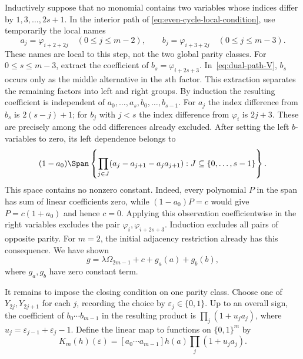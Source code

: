 Inductively suppose that no monomial contains two variables whose indices
differ by $1,3,\ldots,2s+1$. In the interior path of
\eqref{eq:even-cycle-local-condition}, use temporarily the local names
\[
 a_j=\varphi_{i+2+2j}\quad(0\le j\le m-2),\qquad
 b_j=\varphi_{i+3+2j}\quad(0\le j\le m-3).
\]
These names are local to this step, not the two global parity classes.
For $0\le s\le m-3$, extract the coefficient of
$b_s=\varphi_{i+2s+3}$.
In~\eqref{eq:dual-path-V}, $b_s$ occurs only as the middle alternative
in the $s$th factor. This extraction separates the remaining factors
into left and right groups. By induction the resulting coefficient is
independent of $a_0,\ldots,a_s,b_0,\ldots,b_{s-1}$. For $a_j$ the
index difference from $b_s$ is $2(s-j)+1$; for $b_j$ with $j<s$ the
index difference from $\varphi_i$ is $2j+3$. These are precisely among
the odd differences already excluded.
After setting the left $b$-variables to zero, its left dependence belongs
to
\begin{equation}\label{eq:no-constant-left-space}
(1-a_0)\Span\left\{
\prod_{j\in J}(a_j-a_{j+1}-a_ja_{j+1}):J\subseteq\{0,\ldots,s-1\}
\right\}.
\end{equation}
This space contains no nonzero constant. Indeed, every polynomial $P$
in the span has sum of linear coefficients zero, while
$(1-a_0)P=c$ would give $P=c(1+a_0)$ and hence $c=0$.
Applying this observation coefficientwise in the right variables excludes
the pair $\varphi_i,\varphi_{i+2s+3}$. Induction excludes all pairs of
opposite parity. For $m=2$, the initial adjacency restriction already
has this consequence. We have shown
\begin{equation}\label{eq:even-support-decomposition}
g=\lambda\Omega_{2m-1}+c+g_a(a)+g_b(b),
\end{equation}
where $g_a,g_b$ have zero constant term.

It remains to impose the closing condition on one parity class.
Choose one of $Y_{2j},Y_{2j+1}$ for each $j$, recording the choice by
$\varepsilon_j\in\{0,1\}$. Up to an overall sign, the coefficient of
$b_0\cdots b_{m-1}$ in the resulting product is
$\prod_j(1+u_ja_j)$, where $u_j=\varepsilon_{j-1}+\varepsilon_j-1$.
Define the linear map to functions on $\{0,1\}^m$ by
\begin{equation}\label{eq:Boolean-closing-map}
K_m(h)(\varepsilon)
=[a_0\cdots a_{m-1}]h(a)\prod_j(1+u_ja_j).
\end{equation}

